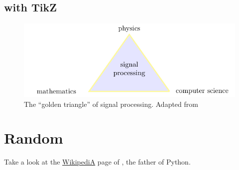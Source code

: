 \documentclass{article}
\begin{document}

	\subsection{with TikZ} %
	\label{sub:with_tikz}

	\begin{figure}[h]
		\centering
		\includegraphics{images/goldentriangle}
		\caption{The ``golden triangle'' of signal processing. Adapted from \cite{Flandrin18theconversation}}
	\end{figure}



\section{Random} %
\label{sec:random}

	Take a look at the \href{https://en.wikipedia.org/wiki/Linus_Torvalds}{WikipediA} page of \citet{Python}, the father of Python.





\end{document}
